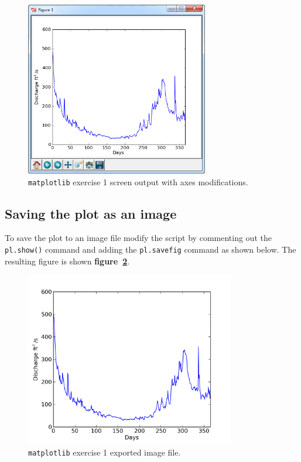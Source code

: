 \documentclass[12pt]{article}
\begin{document}
\begin{figure}
	\centering
  	\includegraphics[height=3in]{figures/pl_PLOT_axes.png}
 	\caption{\texttt{matplotlib} exercise 1 screen output with axes modifications.}
	\label{FigEx1ModScreenPlot}
\end{figure}

\subsection{Saving the plot as an image}
To save the plot to an image file modify the script by commenting out the \texttt{pl.show()} command and adding the \texttt{pl.savefig} command as shown below. The resulting figure is shown \textbf{figure~\ref{FigEx1Export}}.

\begin{center}
	
\end{center}

\begin{figure}[hp]
	\centering
  	\includegraphics[height=3in]{../figures/matplotlibExercise1-base.png}
 	\caption{\texttt{matplotlib} exercise 1 exported image file.}
	\label{FigEx1Export}
\end{figure}
\end{document}
